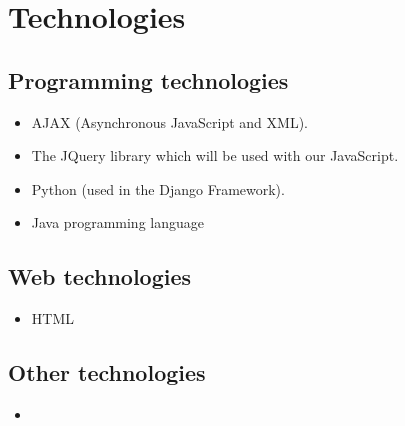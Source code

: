 \documentclass[12pt, oneside]{article}
\begin{document}
\section{Technologies}
	\subsection{Programming technologies}
		\begin{itemize}
			\item AJAX (Asynchronous JavaScript and XML).
			\item The JQuery library which will be used with our JavaScript.
			\item Python (used in the Django Framework).
			\item Java programming language 
		\end{itemize}
	\subsection{Web technologies}
		\begin{itemize}
			\item HTML
		\end{itemize}
	\subsection{Other technologies}
		\begin{itemize}
			\item
		\end{itemize}
\end{document}
